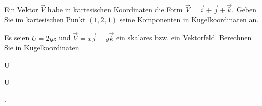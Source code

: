 \begin{atiTask}[
  title = Differentialoperatoren in Kugelkoordinaten
]
\begin{atiSubtasks}
\item Ein Vektor $\vec{V}$ habe in kartesischen Koordinaten die Form
$\vec{V}=\vec{i}+\vec{j}+\vec{k}$.
Geben Sie im kartesischen Punkt $(1,2,1)$ seine Komponenten in Kugelkoordinaten an.

\item Es seien $U=2yz$ und $\vec{V}=x\vec{j}-y\vec{k}$ ein skalares bzw. ein Vektorfeld. Berechnen Sie in Kugelkoordinaten
\begin{multicols}{4}
\begin{atiSubequations}
	\item{U}
	\item{}
	\item{\gradient U}
	\item{\curl {}.}
\end{atiSubequations}

\end{multicols}
\end{atiSubtasks}


\end{atiTask}

% 	
